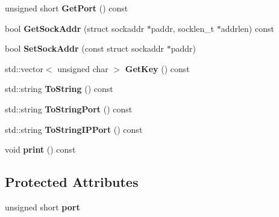 \begin{DoxyCompactItemize}
\mbox{\label{class_c_service_a71caa0d6aa6ab12758bde8b6a6bcfd2a}} 
unsigned short {\bfseries Get\+Port} () const
\item 
\mbox{\label{class_c_service_ac4c6d655fab3af40937f0b0c65581745}} 
bool {\bfseries Get\+Sock\+Addr} (struct sockaddr $\ast$paddr, socklen\+\_\+t $\ast$addrlen) const
\item 
\mbox{\label{class_c_service_a77782219f5d85f326b4c089cb2636e6f}} 
bool {\bfseries Set\+Sock\+Addr} (const struct sockaddr $\ast$paddr)
\item 
\mbox{\label{class_c_service_af21ea7db4318330b337c8bfdcc55aff0}} 
std\+::vector$<$ unsigned char $>$ {\bfseries Get\+Key} () const
\item 
\mbox{\label{class_c_service_a225473158bc07c87a6a862160d73cfea}} 
std\+::string {\bfseries To\+String} () const
\item 
\mbox{\label{class_c_service_a95d6f24b6a613fca24734ba4e38ef3dc}} 
std\+::string {\bfseries To\+String\+Port} () const
\item 
\mbox{\label{class_c_service_a224204c838b12eeb49ca7eabe6f75004}} 
std\+::string {\bfseries To\+String\+I\+P\+Port} () const
\item 
\mbox{\label{class_c_service_a4b104c178cb4b71150a49989f5198302}} 
void {\bfseries print} () const
\end{DoxyCompactItemize}
\subsection*{Protected Attributes}
\begin{DoxyCompactItemize}
\item 
\mbox{\label{class_c_service_aef17734203dc2125cbdf4d23e50be410}} 
unsigned short {\bfseries port}
\end{DoxyCompactItemize}
